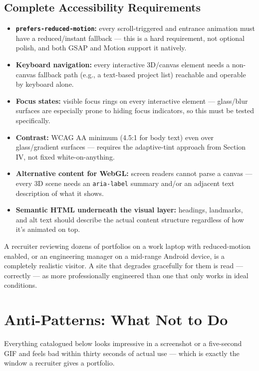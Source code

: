\documentclass[conference]{IEEEtran}
\begin{document}
\subsection{Complete Accessibility Requirements}
\begin{itemize}[leftmargin=*]
\item \textbf{\texttt{prefers-reduced-motion}:} every scroll-triggered and entrance animation must have a reduced/instant fallback --- this is a hard requirement, not optional polish, and both GSAP and Motion support it natively.
\item \textbf{Keyboard navigation:} every interactive 3D/canvas element needs a non-canvas fallback path (e.g., a text-based project list) reachable and operable by keyboard alone.
\item \textbf{Focus states:} visible focus rings on every interactive element --- glass/blur surfaces are especially prone to hiding focus indicators, so this must be tested specifically.
\item \textbf{Contrast:} WCAG AA minimum (4.5:1 for body text) even over glass/gradient surfaces --- requires the adaptive-tint approach from Section IV, not fixed white-on-anything.
\item \textbf{Alternative content for WebGL:} screen readers cannot parse a canvas --- every 3D scene needs an \texttt{aria-label} summary and/or an adjacent text description of what it shows.
\item \textbf{Semantic HTML underneath the visual layer:} headings, landmarks, and alt text should describe the actual content structure regardless of how it's animated on top.
\end{itemize}

A recruiter reviewing dozens of portfolios on a work laptop with reduced-motion enabled, or an engineering manager on a mid-range Android device, is a completely realistic visitor. A site that degrades gracefully for them is read --- correctly --- as more professionally engineered than one that only works in ideal conditions.

\section{Anti-Patterns: What Not to Do}

Everything catalogued below looks impressive in a screenshot or a five-second GIF and feels bad within thirty seconds of actual use --- which is exactly the window a recruiter gives a portfolio.
\end{document}
